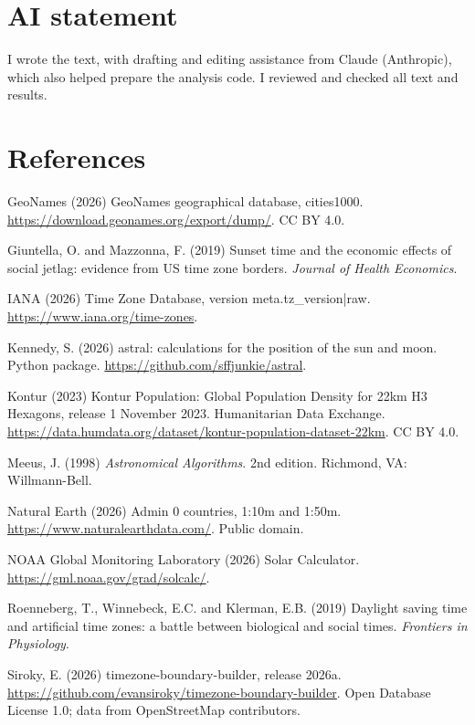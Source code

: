 \documentclass[11pt,a4paper]{article}
\begin{document}
\section*{AI statement}

I wrote the text, with drafting and editing assistance from Claude (Anthropic), which also helped prepare the analysis code. I reviewed and checked all text and results.

\section*{References}
\small
\begin{description}\setlength{\itemsep}{0.2em}
\item GeoNames (2026) GeoNames geographical database, cities1000. \url{https://download.geonames.org/export/dump/}. CC BY 4.0.
\item Giuntella, O. and Mazzonna, F. (2019) Sunset time and the economic effects of social jetlag: evidence from US time zone borders. \emph{Journal of Health Economics}.
\item IANA (2026) Time Zone Database, version {{meta.tz_version|raw}}. \url{https://www.iana.org/time-zones}.
\item Kennedy, S. (2026) astral: calculations for the position of the sun and moon. Python package. \url{https://github.com/sffjunkie/astral}.
\item Kontur (2023) Kontur Population: Global Population Density for 22km H3 Hexagons, release 1 November 2023. Humanitarian Data Exchange. \url{https://data.humdata.org/dataset/kontur-population-dataset-22km}. CC BY 4.0.
\item Meeus, J. (1998) \emph{Astronomical Algorithms}. 2nd edition. Richmond, VA: Willmann-Bell.
\item Natural Earth (2026) Admin 0 countries, 1:10m and 1:50m. \url{https://www.naturalearthdata.com/}. Public domain.
\item NOAA Global Monitoring Laboratory (2026) Solar Calculator. \url{https://gml.noaa.gov/grad/solcalc/}.
\item Roenneberg, T., Winnebeck, E.C. and Klerman, E.B. (2019) Daylight saving time and artificial time zones: a battle between biological and social times. \emph{Frontiers in Physiology}.
\item Siroky, E. (2026) timezone-boundary-builder, release 2026a. \url{https://github.com/evansiroky/timezone-boundary-builder}. Open Database License 1.0; data from OpenStreetMap contributors.
\end{description}
\end{document}
